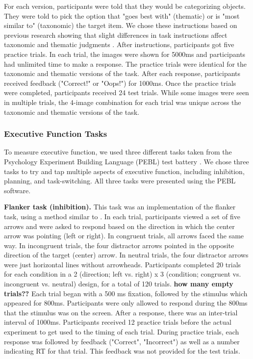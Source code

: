 \documentclass[../dissertation.tex]{subfiles}
\begin{document}
For each version, participants were told that they would be categorizing objects. They were told to pick the option that "goes best with" (thematic) or is "most similar to" (taxonomic) the target item. We chose these instructions based on previous research showing that slight differences in task instructions affect taxonomic and thematic judgments \citep{Lin2001}. After instructions, participants got five practice trials. In each trial, the images were shown for 5000ms and participants had unlimited time to make a response. The practice trials were identical for the taxonomic and thematic versions of the task. After each response, participants received feedback ("Correct!" or "Oops!") for 1000ms. Once the practice trials were completed, participants received 24 test trials. While some images were seen in multiple trials, the 4-image combination for each trial was unique across the taxonomic and thematic versions of the task.
\subsubsection{Executive Function Tasks} 
To measure executive function, we used three different tasks taken from the Psychology Experiment Building Language (PEBL) test battery \citep{Anderson2012}. We chose three tasks to try and tap multiple aspects of executive function, including inhibition, planning, and task-switching. All three tasks were presented using the PEBL software.\par
\textbf{Flanker task (inhibition).} This task was an implementation of the \citet{Eriksen1979} flanker task, using a method similar to \citet{Stins2007}. In each trial, participants viewed a set of five arrows and were asked to respond based on the direction in which the center arrow was pointing (left or right). In congruent trials, all arrows faced the same way. In incongruent trials, the four distractor arrows pointed in the opposite direction of the target (center) arrow. In neutral trials, the four distractor arrows were just horizontal lines without arrowheads. Participants completed 20 trials for each condition in a 2 (direction; left vs. right) x 3 (condition; congruent vs. incongruent vs. neutral) design, for a total of 120 trials. \textbf{how many empty trials??} Each trial began with a 500 ms fixation, followed by the stimulus which appeared for 800ms. Participants were only allowed to respond during the 800ms that the stimulus was on the screen. After a response, there was an inter-trial interval of 1000ms. Participants received 12 practice trials before the actual experiment to get used to the timing of each trial. During practice trials, each response was followed by feedback ("Correct", "Incorrect") as well as a number indicating RT for that trial. This feedback was not provided for the test trials.
\end{document}

